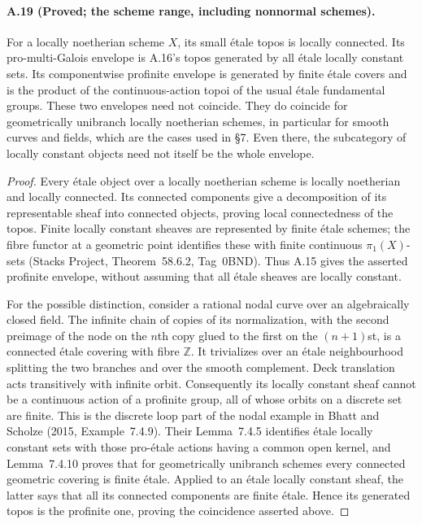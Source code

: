 \paragraph{A.19 (Proved; the scheme range, including nonnormal schemes).}
For a locally noetherian scheme $X$, its small étale topos is locally connected. Its pro-multi-Galois envelope is A.16's topos generated by all étale locally constant sets. Its componentwise profinite envelope is generated by finite étale covers and is the product of the continuous-action topoi of the usual étale fundamental groups. These two envelopes need not coincide. They do coincide for geometrically unibranch locally noetherian schemes, in particular for smooth curves and fields, which are the cases used in \S7. Even there, the subcategory of locally constant objects need not itself be the whole envelope.
\begin{proof}
Every étale object over a locally noetherian scheme is locally noetherian and locally connected. Its connected components give a decomposition of its representable sheaf into connected objects, proving local connectedness of the topos. Finite locally constant sheaves are represented by finite étale schemes; the fibre functor at a geometric point identifies these with finite continuous $\pi_1(X)$-sets (Stacks Project, Theorem~58.6.2, Tag~0BND). Thus A.15 gives the asserted profinite envelope, without assuming that all étale sheaves are locally constant.

For the possible distinction, consider a rational nodal curve over an algebraically closed field. The infinite chain of copies of its normalization, with the second preimage of the node on the $n$th copy glued to the first on the $(n+1)$st, is a connected étale covering with fibre $\mathbb Z$. It trivializes over an étale neighbourhood splitting the two branches and over the smooth complement. Deck translation acts transitively with infinite orbit. Consequently its locally constant sheaf cannot be a continuous action of a profinite group, all of whose orbits on a discrete set are finite. This is the discrete loop part of the nodal example in Bhatt and Scholze (2015, Example~7.4.9). Their Lemma~7.4.5 identifies étale locally constant sets with those pro-étale actions having a common open kernel, and Lemma~7.4.10 proves that for geometrically unibranch schemes every connected geometric covering is finite étale. Applied to an étale locally constant sheaf, the latter says that all its connected components are finite étale. Hence its generated topos is the profinite one, proving the coincidence asserted above.


\end{proof}
